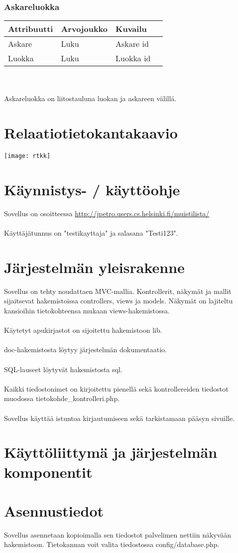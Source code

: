 \documentclass{report}
\begin{document}
\subsubsection*{Askareluokka}
\begin{tabular}{ | l | l | l | p{7.5cm} |} \hline
\textbf{Attribuutti} & \textbf{Arvojoukko} & \textbf{Kuvailu} \\ \hline
Askare & Luku & Askare id \\ \hline
Luokka & Luku & Luokka id \\ \hline
\end{tabular}
\\ \\ Askareluokka on liitostauluna luokan ja askareen välillä.

\section*{Relaatiotietokantakaavio}
\texttt{[image: rtkk]}

\section*{Käynnistys- / käyttöohje}
Sovellus on osoitteessa \href{http://jpetro.users.cs.helsinki.fi/muistilista/}{http://jpetro.users.cs.helsinki.fi/muistilista/} \\ \\
Käyttäjätunnus on "testikayttaja" ja salasana "Testi123".

\section*{Järjestelmän yleisrakenne}
Sovellus on tehty noudattaen MVC-mallia. Kontrollerit, näkymät ja mallit
sijaitsevat hakemistoissa controllers, views ja models. Näkymät on lajiteltu kansioihin tietokohteensa mukaan views-hakemistossa. \\ \\ Käytetyt apukirjastot on sijoitettu hakemistoon lib. \\ \\ doc-hakemistosta löytyy järjestelmän dokumentaatio. \\ \\ SQL-lauseet löytyvät hakemistosta sql. \\ \\ Kaikki tiedostonimet on kirjoitettu pienellä sekä kontrollereiden tiedostot muodossa tietokohde{\_}kontrolleri.php. \\ \\ Sovellus käyttää istuntoa kirjautumiseen sekä tarkistamaan pääsyn sivuille.

\section*{Käyttöliittymä ja järjestelmän komponentit}

\section*{Asennustiedot}
Sovellus asennetaan kopioimalla sen tiedostot palvelimen nettiin näkyvään hakemistoon. Tietokannan voit valita tiedostossa config/database.php.
\end{document}
